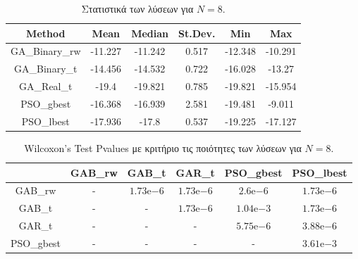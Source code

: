 \documentclass[12pt, a4paper]{article}
\newcommand{\en}{\selectlanguage{english}}
\newcommand{\gr}{\selectlanguage{greek}}
\begin{document}
\begin{table}[H]
	\centering
	\begin{tabular}{| c | c | c | c | c | c |}
		
		\hline
		\en Method & \en Mean & \en Median & \en St.Dev. & \en Min & \en Max \\
		
		\hline
		\en GA\_Binary\_rw & -11.227 & -11.242 & 0.517 & -12.348 & -10.291 \\ 
		
		\hline
		\en GA\_Binary\_t & -14.456 & -14.532 & 0.722 & -16.028 & -13.27 \\ 
		
		\hline
		\en GA\_Real\_t & -19.4 & -19.821 & 0.785 & -19.821 & -15.954 \\ 
		
		\hline
		\en PSO\_gbest & -16.368 & -16.939 & 2.581 & -19.481 & -9.011\\ 
		
		\hline
		\en PSO\_lbest & -17.936 & -17.8 & 0.537 & -19.225 & -17.127\\ 
		
		\hline
		
	\end{tabular}
	\caption{Στατιστικά των λύσεων για $N = 8$.}
	\label{tab:sol_qual_N8}
\end{table}

\begin{table}[H]
	\centering
	\begin{tabular}{| c | c | c | c | c | c |}
		
		\hline
		\en  & \en GAB\_rw & \en GAB\_t & \en GAR\_t & \en PSO\_gbest & \en PSO\_lbest\\
		
		\hline
		\en GAB\_rw & - & $1.73\mathrm{e}{-6}$ & $1.73\mathrm{e}{-6}$ & $2.6\mathrm{e}{-6}$ & $1.73\mathrm{e}{-6}$ \\ 
		
		\hline
		\en GAB\_t & - & - & $1.73\mathrm{e}{-6}$ & $1.04\mathrm{e}{-3}$ & $1.73\mathrm{e}{-6}$ \\ 
		
		\hline
		\en GAR\_t & - & - & - & $5.75\mathrm{e}{-6}$ & $3.88\mathrm{e}{-6}$ \\ 
		
		\hline
		\en PSO\_gbest & - & - & - & - & $3.61\mathrm{e}{-3}$\\ 
		
		\hline
		
	\end{tabular}
	\caption{\en Wilcoxon's Test Pvalues \gr με κριτήριο τις ποιότητες των λύσεων για $N = 8$.}
	\label{tab:sol_qual_pval_N8}
\end{table}
\end{document}
